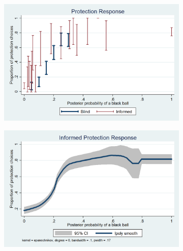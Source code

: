 \documentclass[12pt,a4paper]{article}
\begin{document}
\begin{figure}[H]
\centering
\caption{Average Protection Response} \label{Prot_Response_Fig}
\begin{subfigure}[t]{.48\textwidth}
  \centering
  \includegraphics[width=\textwidth]{Graphs/ip_response_comp.png}
\end{subfigure}
\begin{subfigure}[t]{.48\textwidth}
  \centering
  \includegraphics[width=\textwidth]{Graphs/ip_response_lpoly.png}

\end{subfigure}
\end{figure}
\end{document}
